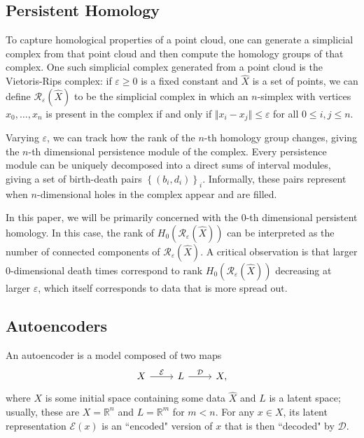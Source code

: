 \documentclass[conference]{IEEEtran}
\newcommand{\R}{\mathbb{R}}
\begin{document}
\subsection{Persistent Homology}

To capture homological properties of a point cloud, one can generate a simplicial complex from that point cloud and then compute the homology groups of that complex. One such simplicial complex generated from a point cloud is the Vietoris-Rips complex: if $\varepsilon \geq 0$ is a fixed constant and $\hat{X}$ is a set of points, we can define $\mathcal{R}_{\varepsilon}(\hat{X})$ to be the simplicial complex in which an $n$-simplex with vertices $x_0, \dots, x_{n}$ is present in the complex if and only if ${\Vert{x_i-x_j}\Vert} \leq \varepsilon$ for all $0 \leq i,j \leq n$.

Varying $\varepsilon$, we can track how the rank of the $n$-th homology group changes, giving the $n$-th dimensional persistence module of the complex. Every persistence module can be uniquely decomposed into a direct sums of interval modules, giving a set of birth-death pairs $\left\{ (b_i, d_i) \right\}_{i}$. Informally, these pairs represent when $n$-dimensional holes in the complex appear and are filled.

In this paper, we will be primarily concerned with the 0-th dimensional persistent homology. In this case, the rank of $H_{0}(\mathcal{R}_{\varepsilon}(\hat{X}))$ can be interpreted as the number of connected components of $\mathcal{R}_{\varepsilon}(\hat{X})$. A critical observation is that larger 0-dimensional death times correspond to $\text{rank } H_{0}(\mathcal{R}_{\varepsilon}(\hat{X}))$ decreasing at larger $\varepsilon$, which itself corresponds to data that is more spread out.

\subsection{Autoencoders}
\label{ae-summary}

An autoencoder is a model composed of two maps
\[
	\begin{tikzcd}
		X \rar{\mathcal{E}} & L \rar{\mathcal{D}} & X,
	\end{tikzcd}
\] 
where $X$ is some initial space containing some data $\hat{X}$ and $L$ is a latent space; usually, these are $X = \R^{n}$ and $L = \R^{m}$ for $m < n$. For any $x \in X$, its latent representation $\mathcal{E}(x)$ is an ``encoded" version of $x$ that is then ``decoded" by $\mathcal{D}$.
\end{document}
